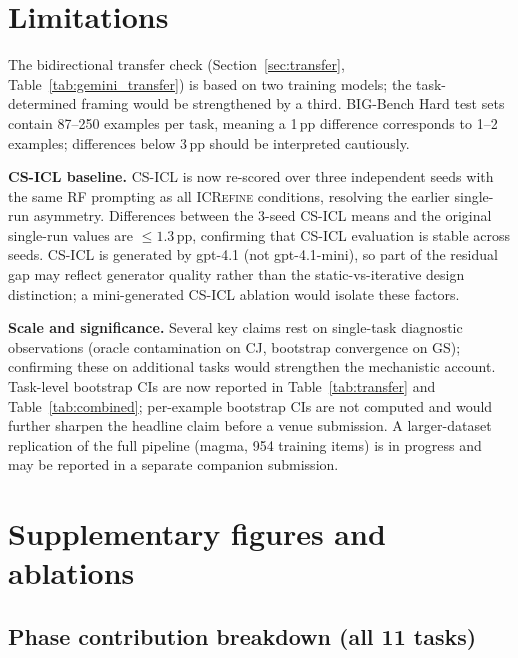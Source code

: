 \documentclass{article}
\begin{document}
\section{Limitations}
\label{sec:limits}

The bidirectional transfer check (Section~\ref{sec:transfer}, Table~\ref{tab:gemini_transfer})
is based on two training models; the task-determined framing would be strengthened by a third.
BIG-Bench Hard test sets contain 87--250 examples per task, meaning a 1\,pp difference
corresponds to 1--2 examples; differences below 3\,pp should be interpreted cautiously.

\textbf{CS-ICL baseline.}
CS-ICL is now re-scored over three independent seeds with the same RF prompting as all
\textsc{ICRefine} conditions, resolving the earlier single-run asymmetry.
Differences between the 3-seed CS-ICL means and the original single-run values are $\leq 1.3$\,pp,
confirming that CS-ICL evaluation is stable across seeds.
CS-ICL is generated by gpt-4.1 (not gpt-4.1-mini), so part of the residual gap may
reflect generator quality rather than the static-vs-iterative design distinction;
a mini-generated CS-ICL ablation would isolate these factors.

\textbf{Scale and significance.}
Several key claims rest on single-task diagnostic observations (oracle contamination on CJ,
bootstrap convergence on GS); confirming these on additional tasks would strengthen the
mechanistic account.
Task-level bootstrap CIs are now reported in Table~\ref{tab:transfer} and Table~\ref{tab:combined};
per-example bootstrap CIs are not computed and would further sharpen the headline claim before
a venue submission.
A larger-dataset replication of the full pipeline (magma, 954 training items) is in progress
and may be reported in a separate companion submission.





\appendix

\section{Supplementary figures and ablations}
\label{sec:size_appendix}

\subsection{Phase contribution breakdown (all 11 tasks)}
\end{document}
